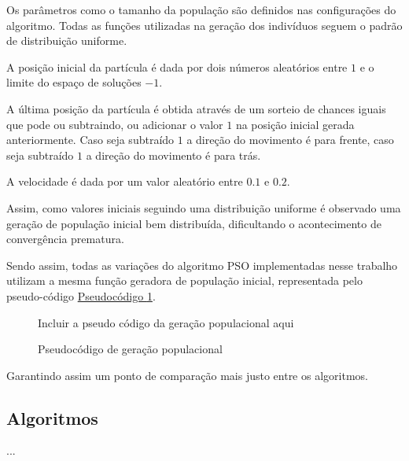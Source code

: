         Os parâmetros como o tamanho da população são definidos nas configurações do algoritmo. Todas as funções utilizadas na geração dos indivíduos seguem o padrão de distribuição uniforme.\newline
        
        A posição inicial da partícula é dada por dois números aleatórios entre $1$ e o limite do espaço de soluções $- 1$.\newline
        
        A última posição da partícula é obtida através de um sorteio de chances iguais que pode ou subtraindo, ou adicionar o valor $1$ na posição inicial gerada anteriormente. Caso seja subtraído $1$ a direção do movimento é para frente, caso seja subtraído $1$ a direção do movimento é para trás.\newline

        A velocidade é dada por um valor aleatório entre $0.1$ e $0.2$.\newline

        Assim, como valores iniciais seguindo uma distribuição uniforme é observado uma geração de população inicial bem distribuída, dificultando o acontecimento de convergência prematura.
        
        Sendo assim, todas as variações do algoritmo PSO implementadas nesse trabalho utilizam a mesma função geradora de população inicial, representada pelo pseudo-código \hyperref[cod:geracao-pop]{Pseudocódigo \ref{cod:geracao-pop}}.
        
        \begin{figure}[h]
            \centering
            \small{Incluir a pseudo código da geração populacional aqui}
            \caption{Pseudocódigo de geração populacional}
            \label{cod:geracao-pop}
        \end{figure}
        
        \noindent Garantindo assim um ponto de comparação mais justo entre os algoritmos.



    \subsection{Algoritmos}
            ...

